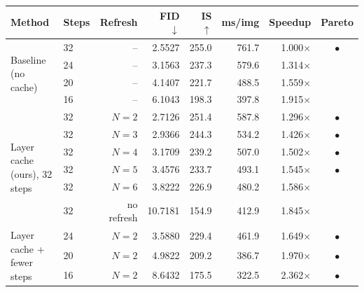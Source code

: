 \begin{tabular}{llrrrrrc}
\toprule
Method & Steps & Refresh & FID $\downarrow$ & IS $\uparrow$ & ms/img & Speedup & Pareto \\
\midrule
\multirow{4}{*}{Baseline (no cache)} & 32 & -- & 2.5527 & 255.0 & 761.7 & 1.000$\times$ & $\bullet$ \\
 & 24 & -- & 3.1563 & 237.3 & 579.6 & 1.314$\times$ &  \\
 & 20 & -- & 4.1407 & 221.7 & 488.5 & 1.559$\times$ &  \\
 & 16 & -- & 6.1043 & 198.3 & 397.8 & 1.915$\times$ &  \\
\midrule
\multirow{6}{*}{Layer cache (ours), 32 steps} & 32 & $N=2$ & 2.7126 & 251.4 & 587.8 & 1.296$\times$ & $\bullet$ \\
 & 32 & $N=3$ & 2.9366 & 244.3 & 534.2 & 1.426$\times$ & $\bullet$ \\
 & 32 & $N=4$ & 3.1709 & 239.2 & 507.0 & 1.502$\times$ & $\bullet$ \\
 & 32 & $N=5$ & 3.4576 & 233.7 & 493.1 & 1.545$\times$ & $\bullet$ \\
 & 32 & $N=6$ & 3.8222 & 226.9 & 480.2 & 1.586$\times$ &  \\
 & 32 & no refresh & 10.7181 & 154.9 & 412.9 & 1.845$\times$ &  \\
\midrule
\multirow{3}{*}{Layer cache + fewer steps} & 24 & $N=2$ & 3.5880 & 229.4 & 461.9 & 1.649$\times$ & $\bullet$ \\
 & 20 & $N=2$ & 4.9822 & 209.2 & 386.7 & 1.970$\times$ & $\bullet$ \\
 & 16 & $N=2$ & 8.6432 & 175.5 & 322.5 & 2.362$\times$ & $\bullet$ \\
\bottomrule
\end{tabular}
